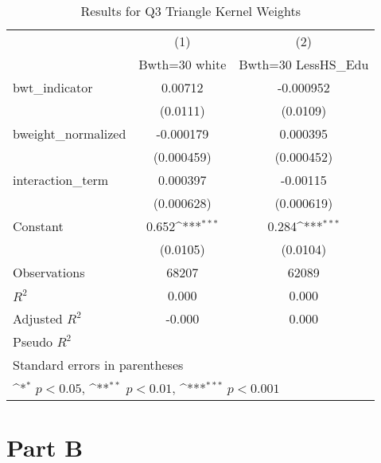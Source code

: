 \documentclass{article}
\begin{document}
\begin{table}[H]\centering
\def\sym#1{\ifmmode^{#1}\else\(^{#1}\)\fi}
\caption{Results for Q3 Triangle Kernel Weights \label{q3tri}}
\begin{tabular}{l*{2}{c}}
\toprule
                    &\multicolumn{1}{c}{(1)}&\multicolumn{1}{c}{(2)}\\
                    &\multicolumn{1}{c}{Bwth=30 white}&\multicolumn{1}{c}{Bwth=30 LessHS\_Edu}\\
\midrule
bwt\_indicator       &     0.00712         &   -0.000952         \\
                    &    (0.0111)         &    (0.0109)         \\
\addlinespace
bweight\_normalized  &   -0.000179         &    0.000395         \\
                    &  (0.000459)         &  (0.000452)         \\
\addlinespace
interaction\_term    &    0.000397         &    -0.00115         \\
                    &  (0.000628)         &  (0.000619)         \\
\addlinespace
Constant            &       0.652\sym{***}&       0.284\sym{***}\\
                    &    (0.0105)         &    (0.0104)         \\
\midrule
Observations        &       68207         &       62089         \\
\(R^{2}\)           &       0.000         &       0.000         \\
Adjusted \(R^{2}\)  &      -0.000         &       0.000         \\
Pseudo \(R^{2}\)    &                     &                     \\
\bottomrule
\multicolumn{3}{l}{\footnotesize Standard errors in parentheses}\\
\multicolumn{3}{l}{\footnotesize \sym{*} \(p<0.05\), \sym{**} \(p<0.01\), \sym{***} \(p<0.001\)}\\
\end{tabular}
\end{table}






\part*{Part B}
\end{document}
